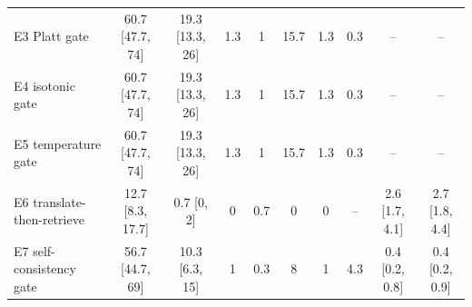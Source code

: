 \begin{table}[t]
\begin{tabular}{lccccccccc}
    E3 Platt gate & 60.7 [47.7, 74] & 19.3 [13.3, 26] & 1.3 & 1 & 15.7 & 1.3 & 0.3 & -- & -- \\
    E4 isotonic gate & 60.7 [47.7, 74] & 19.3 [13.3, 26] & 1.3 & 1 & 15.7 & 1.3 & 0.3 & -- & -- \\
    E5 temperature gate & 60.7 [47.7, 74] & 19.3 [13.3, 26] & 1.3 & 1 & 15.7 & 1.3 & 0.3 & -- & -- \\
    E6 translate-then-retrieve & 12.7 [8.3, 17.7] & 0.7 [0, 2] & 0 & 0.7 & 0 & 0 & -- & 2.6 [1.7, 4.1] & 2.7 [1.8, 4.4] \\
    E7 self-consistency gate & 56.7 [44.7, 69] & 10.3 [6.3, 15] & 1 & 0.3 & 8 & 1 & 4.3 & 0.4 [0.2, 0.8] & 0.4 [0.2, 0.9] \\
    \bottomrule
  \end{tabular}
\end{table}

